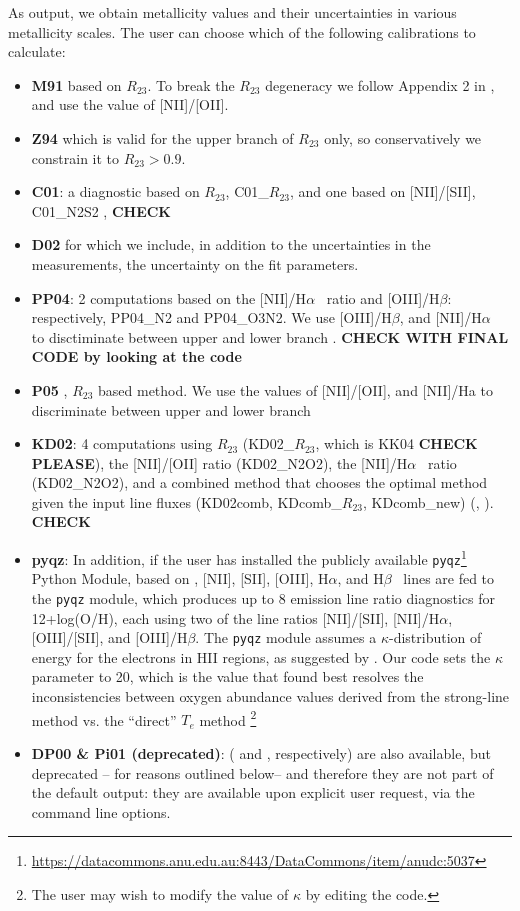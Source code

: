 \documentclass{emulateapj}
\newcommand{\ha}{H$\alpha$}
\newcommand{\hb}{H$\beta$}
\begin{document}
As output, we obtain metallicity values and their uncertainties in various metallicity scales. The user can choose which of the following calibrations to calculate: 
\begin{itemize}
\item {\bf M91} \citep{mcgaugh91} based on $R_{23}$. To break the $R_{23}$ degeneracy we follow Appendix 2 in \citet{kewley08}, and use the value of [NII]/[OII].
\item {\bf Z94} \citep{zaritsky94} which is valid for the upper branch of $R_{23}$ only, so conservatively we constrain it to $R_{23}>0.9$.
\item {\bf C01}: a diagnostic based on $R_{23}$, C01\_$R_{23}$, and one based on [NII]/[SII], C01\_N2S2  \citep{charlot01}, \textbf{CHECK}%
\item {\bf D02} \citep{denicolo02} for which we include, in addition to the uncertainties in the measurements, the uncertainty on the fit parameters.
\item {\bf PP04}:  \citep{pettini04} 2 computations based on the [NII]/\ha~ ratio and [OIII]/\hb: respectively, PP04\_N2 and PP04\_O3N2.  We use [OIII]/\hb, and  [NII]/\ha~ to disctiminate between upper and lower branch \citep{kewley08}. \textbf{CHECK WITH FINAL CODE  by looking at the code}
\item {\bf P05} \citep{pilyugin05}, $R_{23}$ based method. We use the values of [NII]/[OII], and  [NII]/Ha to discriminate between upper and lower branch 
\item {\bf KD02}: 4 computations using $R_{23}$ (KD02\_$R_{23}$, which is KK04 \textbf{CHECK PLEASE}), the [NII]/[OII] ratio (KD02\_N2O2), the [NII]/\ha~ ratio (KD02\_N2O2), and a combined method that chooses the optimal method given the input line fluxes (KD02comb, KDcomb\_$R_{23}$, KDcomb\_new) (\citealt{kewley02}, \citealt{kewley08}). \textbf{CHECK}

\item {\bf pyqz}: In addition, if the user has installed the publicly available \verb=pyqz=\footnote{\url{https://datacommons.anu.edu.au:8443/DataCommons/item/anudc:5037}} Python Module, based on \citet{dopita13}, [NII], [SII], [OIII], \ha, and \hb~ lines are fed to the \verb=pyqz= module, which produces up to 8 emission line ratio diagnostics for  12+log(O/H), each using two of the line ratios [NII]/[SII], [NII]/\ha, [OIII]/[SII], and [OIII]/\hb. The \verb=pyqz= module assumes a $\kappa$-distribution of energy for the electrons in HII regions, as suggested by \citet{nicholls12}. Our code sets the $\kappa$ parameter to 20, which is the value that \citet{dopita13} found best resolves the inconsistencies between oxygen abundance values derived from the strong-line method vs. the ``direct'' $T_e$ method \footnote{The user may wish to modify the value of $\kappa$ by editing the code.}
\item{\bf DP00 \& Pi01 (deprecated)}: (\citealt{diaz00} and \citealt{pilyugin01}, respectively) are also available, but deprecated -- for reasons outlined below--  and therefore they are not part of the default output: they are available upon explicit user request, via the command line options. 
\end{itemize}
\end{document}
